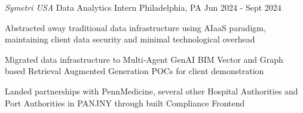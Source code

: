\begin{cventries}
   \cventry
     {\emph{Symetri USA}} %
     {Data Analytics Intern} %
     {Philadelphia, PA} %
     {Jun 2024 - Sept 2024} %
     {
       \begin{cvitems} %
         \item {Abstracted away traditional data infrastructure using AIaaS paradigm, maintaining client data security and minimal technological overhead}
         \item{Migrated data infrastructure to Multi‑Agent GenAI BIM Vector and Graph based Retrieval Augmented Generation POCs for client demonstration }
         \item {Landed partnerships with PennMedicine, several other Hospital Authorities and Port Authorities in PANJNY through built Compliance Frontend}
       \end{cvitems}
     }

\end{cventries}
